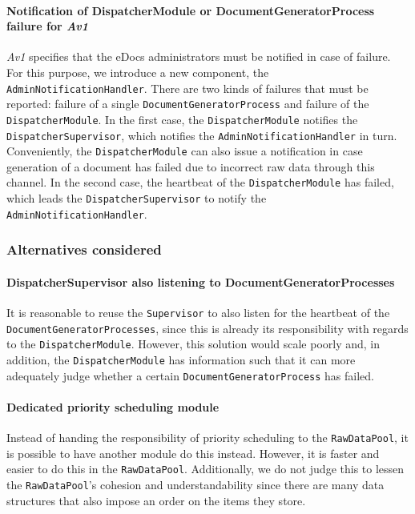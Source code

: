 \documentclass[a4paper,10pt]{article}
\begin{document}
\paragraph{Notification of DispatcherModule or DocumentGeneratorProcess failure for \emph{Av1}}
\emph{Av1} specifies that the eDocs administrators must be notified in case of failure. For this purpose, we introduce a new component, the \texttt{AdminNotificationHandler}. There are two kinds of failures that must be reported: failure of a single \texttt{DocumentGeneratorProcess} and failure of the \texttt{DispatcherModule}. In the first case, the \texttt{DispatcherModule} notifies the \texttt{DispatcherSupervisor}, which notifies the \texttt{AdminNotificationHandler} in turn. Conveniently, the \texttt{DispatcherModule} can also issue a notification in case generation of a document has failed due to incorrect raw data through this channel. In the second case, the heartbeat of the \texttt{DispatcherModule} has failed, which leads the \texttt{DispatcherSupervisor} to notify the \texttt{AdminNotificationHandler}.

\subsubsection*{Alternatives considered}
\paragraph{DispatcherSupervisor also listening to DocumentGeneratorProcesses}
It is reasonable to reuse the \texttt{Supervisor} to also listen for the heartbeat of the \texttt{DocumentGeneratorProcesses}, since this is already its responsibility with regards to the \texttt{DispatcherModule}. However, this solution would scale poorly and, in addition, the \texttt{DispatcherModule} has information such that it can more adequately judge whether a certain \texttt{DocumentGeneratorProcess} has failed.

\paragraph{Dedicated priority scheduling module}
Instead of handing the responsibility of priority scheduling to the \texttt{RawDataPool}, it is possible to have another module do this instead. However, it is faster and easier to do this in the \texttt{RawDataPool}. Additionally, we do not judge this to lessen the \texttt{RawDataPool}'s cohesion and understandability since there are many data structures that also impose an order on the items they store. 
\end{document}
